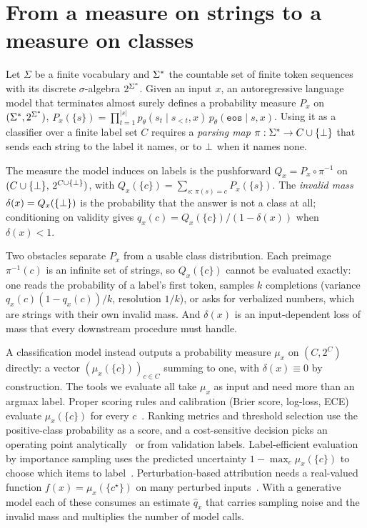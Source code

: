 \section{From a measure on strings to a measure on classes}
\label{sec:background}

Let $\Sigma$ be a finite vocabulary and $\Sigma^{*}$ the countable set of finite token sequences with
its discrete $\sigma$-algebra $2^{\Sigma^{*}}$. Given an input $x$, an autoregressive language model
that terminates almost surely defines a probability measure $P_x$ on $(\Sigma^{*}, 2^{\Sigma^{*}})$,
$P_x(\{s\}) = \prod_{t=1}^{|s|} p_\theta(s_t \mid s_{<t}, x)\, p_\theta(\texttt{eos} \mid s, x)$.
Using it as a classifier over a finite label set $C$ requires a \emph{parsing map}
$\pi : \Sigma^{*} \to C \cup \{\bot\}$ that sends each string to the label it names, or to
$\bot$ when it names none.

\begin{definition}
The measure the model induces on labels is the pushforward $Q_x = P_x \circ \pi^{-1}$ on
$(C \cup \{\bot\},\, 2^{C \cup \{\bot\}})$, with
$Q_x(\{c\}) = \sum_{s:\, \pi(s) = c} P_x(\{s\})$. The \emph{invalid mass}
$\delta(x) = Q_x(\{\bot\})$ is the probability that the answer is not a class at all;
conditioning on validity gives $q_x(c) = Q_x(\{c\}) / (1 - \delta(x))$ when $\delta(x) < 1$.
\end{definition}

Two obstacles separate $P_x$ from a usable class distribution. Each preimage $\pi^{-1}(c)$ is an
infinite set of strings, so $Q_x(\{c\})$ cannot be evaluated exactly: one reads the probability of
a label's first token, samples $k$ completions (variance $q_x(c)(1-q_x(c))/k$, resolution $1/k$),
or asks for verbalized numbers, which are strings with their own invalid mass. And $\delta(x)$ is
an input-dependent loss of mass that every downstream procedure must handle.

A classification model instead outputs a probability measure $\mu_x$ on $(C, 2^C)$ directly: a
vector $(\mu_x(\{c\}))_{c \in C}$ summing to one, with $\delta(x) \equiv 0$ by construction. The
tools we evaluate all take $\mu_x$ as input and need more than an argmax label. Proper scoring
rules and calibration (Brier score, log-loss, ECE) evaluate $\mu_x(\{c\})$ for every
$c$~\citep{brier1950,naeini2015ece,guo2017calibration}. Ranking metrics and threshold selection
use the positive-class probability as a score, and a cost-sensitive decision picks an operating
point analytically~\citep{elkan2001cost} or from validation labels. Label-efficient evaluation by
importance sampling uses the predicted uncertainty $1 - \max_c \mu_x(\{c\})$ to choose which
items to label~\citep{sawade2010are,kossen2021active}. Perturbation-based attribution needs a
real-valued function $f(x) = \mu_x(\{c^\star\})$ on many perturbed
inputs~\citep{lundberg2017shap,ribeiro2016lime}. With a generative model each of these consumes
an estimate $\hat q_x$ that carries sampling noise and the invalid mass and multiplies the number
of model calls.
